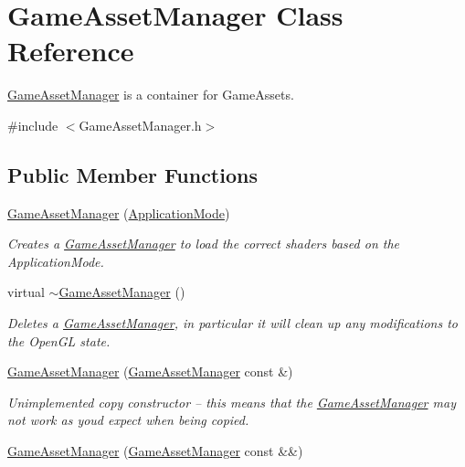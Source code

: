 \hypertarget{classGameAssetManager}{}\section{Game\+Asset\+Manager Class Reference}
\label{classGameAssetManager}


\hyperlink{classGameAssetManager}{Game\+Asset\+Manager} is a container for Game\+Assets.  




{\ttfamily \#include $<$Game\+Asset\+Manager.\+h$>$}

\subsection*{Public Member Functions}
\begin{DoxyCompactItemize}
\item 
\hyperlink{classGameAssetManager_aaa0d58e276cc10ad91a7457085598a71}{Game\+Asset\+Manager} (\hyperlink{common_8h_add86e7c88dd109abea3f708b422f31f0}{Application\+Mode})
\begin{DoxyCompactList}\small\item\em Creates a \hyperlink{classGameAssetManager}{Game\+Asset\+Manager} to load the correct shaders based on the Application\+Mode. \end{DoxyCompactList}\item 
virtual \hyperlink{classGameAssetManager_a1270bd61ecbcca563f079803e40c9b77}{$\sim$\+Game\+Asset\+Manager} ()
\begin{DoxyCompactList}\small\item\em Deletes a \hyperlink{classGameAssetManager}{Game\+Asset\+Manager}, in particular it will clean up any modifications to the Open\+G\+L state. \end{DoxyCompactList}\item 
\hyperlink{classGameAssetManager_a2c9adcb72faa154c87eadc9bafe5269d}{Game\+Asset\+Manager} (\hyperlink{classGameAssetManager}{Game\+Asset\+Manager} const \&)
\begin{DoxyCompactList}\small\item\em Unimplemented copy constructor -- this means that the \hyperlink{classGameAssetManager}{Game\+Asset\+Manager} may not work as you\textquotesingle{}d expect when being copied. \end{DoxyCompactList}\item 
\hyperlink{classGameAssetManager_a44f6e2fd6b8ff1dd64e5697f1be7386d}{Game\+Asset\+Manager} (\hyperlink{classGameAssetManager}{Game\+Asset\+Manager} const \&\&)

\end{DoxyCompactItemize}
